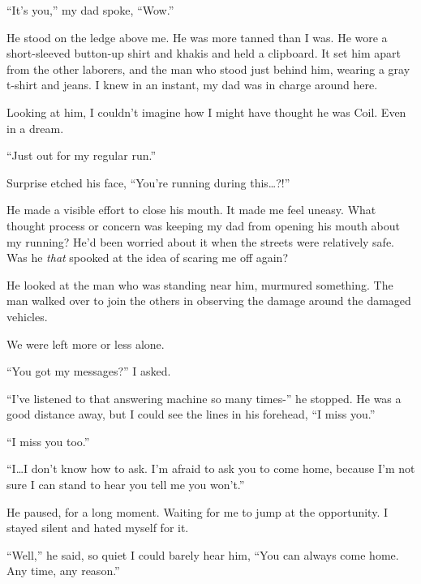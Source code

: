 ``It's you,'' my dad spoke, ``Wow.''



He stood on the ledge above me.  He was more tanned than I was.  He wore a short-sleeved button-up shirt and khakis and held a clipboard.  It set him apart from the other laborers, and the man who stood just behind him, wearing a gray t-shirt and jeans.  I knew in an instant, my dad was in charge around here.



Looking at him, I couldn't imagine how I might have thought he was Coil.  Even in a dream.



``Just out for my regular run.''



Surprise etched his face, ``You're running during this\ldots?!''



He made a visible effort to close his mouth.  It made me feel uneasy.  What thought process or concern was keeping my dad from opening his mouth about my running?  He'd been worried about it when the streets were relatively safe.  Was he \emph{that} spooked at the idea of scaring me off again?



He looked at the man who was standing near him, murmured something.  The man walked over to join the others in observing the damage around the damaged vehicles.



We were left more or less alone.



``You got my messages?''  I asked.



``I've listened to that answering machine so many times-'' he stopped.  He was a good distance away, but I could see the lines in his forehead, ``I miss you.''



``I miss you too.''



``I\ldots I don't know how to ask.  I'm afraid to ask you to come home, because I'm not sure I can stand to hear you tell me you won't.''



He paused, for a long moment.  Waiting for me to jump at the opportunity.  I stayed silent and hated myself for it.



``Well,'' he said, so quiet I could barely hear him, ``You can always come home.  Any time, any reason.''



